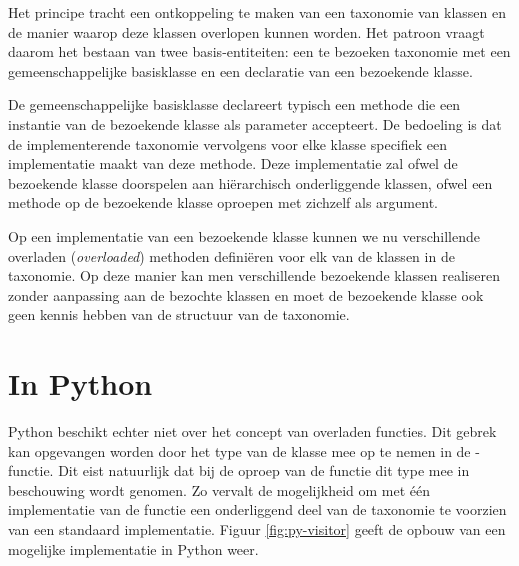 Het principe tracht een ontkoppeling te maken van een taxonomie van klassen en
de manier waarop deze klassen overlopen kunnen worden. Het patroon vraagt
daarom het bestaan van twee basis-entiteiten: een te bezoeken taxonomie met een
gemeenschappelijke basisklasse en een declaratie van een bezoekende klasse.

De gemeenschappelijke basisklasse declareert typisch een methode 
die een instantie van de bezoekende klasse als parameter accepteert. De
bedoeling is dat de implementerende taxonomie vervolgens voor elke klasse
specifiek een implementatie maakt van deze methode. Deze implementatie zal
ofwel de bezoekende klasse doorspelen aan hi\"erarchisch onderliggende klassen,
ofwel een  methode op de bezoekende klasse oproepen met zichzelf als
argument.

Op een implementatie van een bezoekende klasse kunnen we nu verschillende
overladen (\emph{overloaded}) methoden defini\"eren voor elk van de klassen in
de taxonomie. Op deze manier kan men verschillende bezoekende klassen
realiseren zonder aanpassing aan de bezochte klassen en moet de bezoekende
klasse ook geen kennis hebben van de structuur van de taxonomie.

\section{In Python}

Python beschikt echter niet over het concept van overladen functies. Dit gebrek
kan opgevangen worden door het type van de klasse mee op te nemen in de
-functie. Dit eist natuurlijk dat bij de oproep van de
 functie dit type mee in beschouwing wordt genomen. Zo
vervalt de mogelijkheid om met \'e\'en implementatie van de functie een
onderliggend deel van de taxonomie te voorzien van een standaard implementatie.
Figuur \ref{fig:py-visitor} geeft de opbouw van een mogelijke implementatie in
Python weer.

